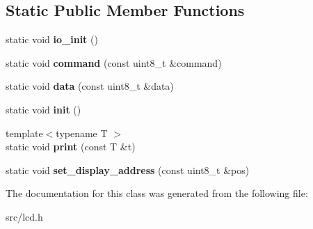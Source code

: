 \subsection*{Static Public Member Functions}
\begin{DoxyCompactItemize}
\item 
\hypertarget{classLcd_a74bcd553e61d9f9c052a2ada7696c1e6}{}\label{classLcd_a74bcd553e61d9f9c052a2ada7696c1e6} 
static void {\bfseries io\+\_\+init} ()
\item 
\hypertarget{classLcd_ac7183eb4a448aa052c49503c902ca261}{}\label{classLcd_ac7183eb4a448aa052c49503c902ca261} 
static void {\bfseries command} (const uint8\+\_\+t \&command)
\item 
\hypertarget{classLcd_a12e1dfd8741ff8f9abcf4cedb976f46e}{}\label{classLcd_a12e1dfd8741ff8f9abcf4cedb976f46e} 
static void {\bfseries data} (const uint8\+\_\+t \&data)
\item 
\hypertarget{classLcd_aefedfd3decc17d6c0a250a15af9053ac}{}\label{classLcd_aefedfd3decc17d6c0a250a15af9053ac} 
static void {\bfseries init} ()
\item 
\hypertarget{classLcd_ad6128575affb14846b529c8453a1a5a8}{}\label{classLcd_ad6128575affb14846b529c8453a1a5a8} 
{\footnotesize template$<$typename T $>$ }\\static void {\bfseries print} (const T \&t)
\item 
\hypertarget{classLcd_a45f400406b7cb57ee26d5eab703b6d1a}{}\label{classLcd_a45f400406b7cb57ee26d5eab703b6d1a} 
static void {\bfseries set\+\_\+display\+\_\+address} (const uint8\+\_\+t \&pos)
\end{DoxyCompactItemize}


The documentation for this class was generated from the following file\+:\begin{DoxyCompactItemize}
\item 
src/lcd.\+h\end{DoxyCompactItemize}
